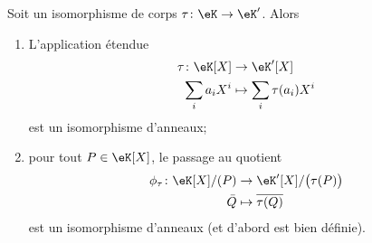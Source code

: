 \begin{lemma}        \label{LEMooGRIMooPxCXAZ}
	Soit un isomorphisme de corps \( \tau\colon \eK\to \eK'\). Alors
	\begin{enumerate}
		\item
		      L'application étendue
		      \begin{equation}
			      \begin{aligned}
				      \tau\colon \eK[X] & \to \eK'[X]                \\
				      \sum_ia_iX^i      & \mapsto \sum_i\tau(a_i)X^i
			      \end{aligned}
		      \end{equation}
		      est un isomorphisme d'anneaux;
		\item
		      pour tout \( P\in \eK[X]\), le passage au quotient
		      \begin{equation}
			      \begin{aligned}
				      \phi_{\tau}\colon \eK[X]/(P) & \to \eK'[X]/\big( \tau(P) \big) \\
				      \bar Q                       & \mapsto \overline{ \tau(Q) }
			      \end{aligned}
		      \end{equation}
		      est un isomorphisme d'anneaux (et d'abord est bien définie).
	\end{enumerate}
\end{lemma}

